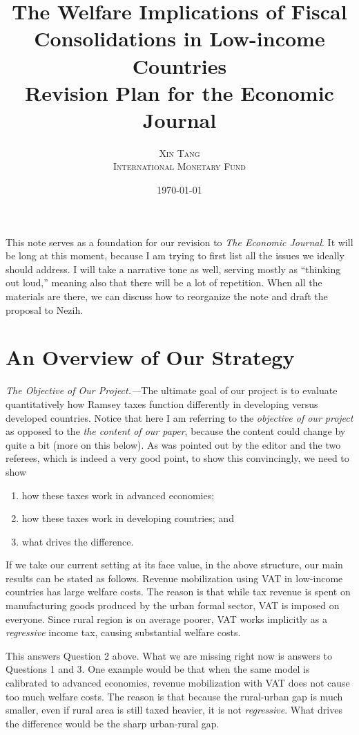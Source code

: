 \documentclass[twoside,11pt,leqno]{article}
\title{\vspace{-1cm}\Large{\textsf{The Welfare Implications of Fiscal Consolidations in Low-income Countries} \\ \textsf{Revision Plan for the Economic Journal}}}
\author{\normalsize\textsc{Xin Tang} \\ \normalsize\textsc{International Monetary Fund}}
\date{\normalsize\today}
\begin{document}
\maketitle

This note serves as a foundation for our revision to \textit{The Economic Journal}. It will be long at this moment, because I am trying to first list all the issues we ideally should address. I will take a narrative tone as well, serving mostly as ``thinking out loud,'' meaning also that there will be a lot of repetition. When all the materials are there, we can discuss how to reorganize the note and draft the proposal to Nezih.

\section{An Overview of Our Strategy}

\textit{The Objective of Our Project.---}The ultimate goal of our project is to evaluate quantitatively how Ramsey taxes function differently in developing versus developed countries. Notice that here I am referring to the \textit{objective of our project} as opposed to the \textit{the content of our paper}, because the content could change by quite a bit (more on this below). As was pointed out by the editor and the two referees, which is indeed a very good point, to show this convincingly, we need to show
\begin{enumerate}
    \item
    how these taxes work in advanced economies;
    \item
    how these taxes work in developing countries; and
    \item
    what drives the difference.
\end{enumerate}
If we take our current setting at its face value, in the above structure, our main results can be stated as follows. Revenue mobilization using VAT in low-income countries has large welfare costs. The reason is that while tax revenue is spent on manufacturing goods produced by the urban formal sector, VAT is imposed on everyone. Since rural region is on average poorer, VAT works implicitly as a \textit{regressive} income tax, causing substantial welfare costs.

This answers Question 2 above. What we are missing right now is answers to Questions 1 and 3. One example would be that when the same model is calibrated to advanced economies, revenue mobilization with VAT does not cause too much welfare costs. The reason is that because the rural-urban gap is much smaller, even if rural area is still taxed heavier, it is not \textit{regressive}. What drives the difference would be the sharp urban-rural gap.
\end{document}
